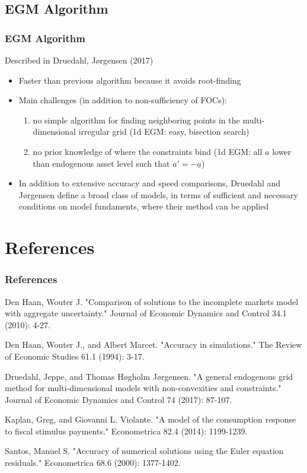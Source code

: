 \documentclass{beamer}
\begin{document}
\subsection{EGM Algorithm}

\begin{frame}
  \frametitle{EGM Algorithm}
  Described in Druedahl, J{\o}rgensen (2017)
  \begin{itemize}
    \item Faster than previous algorithm because it avoids root-finding
    \item Main challenges (in addition to non-sufficiency of FOCs):
      \begin{enumerate}
        \item no simple algorithm for finding neighboring points in the multi-dimensional irregular grid (1d EGM: easy, bisection search)
        \item no prior knowledge of where the constraints bind (1d EGM: all $a$ lower than endogenous asset level such that $a'=-\underline{a}$)
      \end{enumerate}
    \item In addition to extensive accuracy and speed comparisons, Druedahl and J{\o}rgensen define a broad class of models, in terms of sufficient and necessary conditions on model fundaments, where their method can be applied
  \end{itemize}
\end{frame}

\section*{References}

\begin{frame}
  \frametitle{References}
  \footnotesize
  \medskip

  Den Haan, Wouter J. "Comparison of solutions to the incomplete markets model with aggregate uncertainty." Journal of Economic Dynamics and Control 34.1 (2010): 4-27.
  \medskip

  Den Haan, Wouter J., and Albert Marcet. "Accuracy in simulations." The Review of Economic Studies 61.1 (1994): 3-17.
  \medskip

  Druedahl, Jeppe, and Thomas H{\o}gholm J{\o}rgensen. "A general endogenous grid method for multi-dimensional models with non-convexities and constraints." Journal of Economic Dynamics and Control 74 (2017): 87-107.
  \medskip

  Kaplan, Greg, and Giovanni L. Violante. "A model of the consumption response to fiscal stimulus payments." Econometrica 82.4 (2014): 1199-1239.
  \medskip

  Santos, Manuel S. "Accuracy of numerical solutions using the Euler equation residuals." Econometrica 68.6 (2000): 1377-1402.
  \end{frame}
\end{document}

